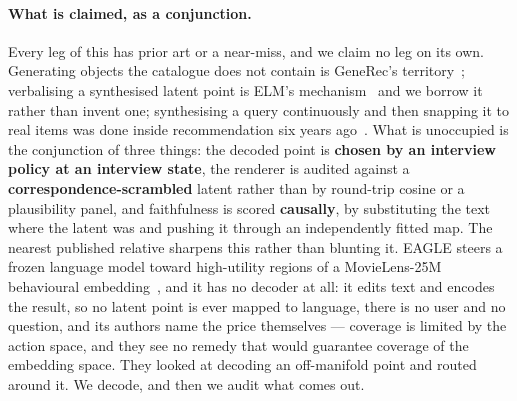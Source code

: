 \documentclass[11pt]{article}
\begin{document}
\paragraph{What is claimed, as a conjunction.} Every leg of this has prior art or a near-miss, and we
claim no leg on its own. Generating objects the catalogue does not contain is GeneRec's
territory~\cite{wang2023generec}; verbalising a synthesised latent point is ELM's
mechanism~\cite{tennenholtz2023elm} and we borrow it rather than invent one; synthesising a query
continuously and then snapping it to real items was done inside recommendation six years
ago~\cite{vendrov2020gradient}. What is unoccupied is the conjunction of three things: the decoded
point is \textbf{chosen by an interview policy at an interview state}, the renderer is audited
against a \textbf{correspondence-scrambled} latent rather than by round-trip cosine or a plausibility
panel, and faithfulness is scored \textbf{causally}, by substituting the text where the latent was
and pushing it through an independently fitted map. The nearest published relative sharpens this
rather than blunting it. EAGLE steers a frozen language model toward high-utility regions of a
MovieLens-25M behavioural embedding~\cite{tennenholtz2024eagle}, and it has no decoder at all: it
edits text and encodes the result, so no latent point is ever mapped to language, there is no user
and no question, and its authors name the price themselves --- coverage is limited by the action
space, and they see no remedy that would guarantee coverage of the embedding space. They looked at
decoding an off-manifold point and routed around it. We decode, and then we audit what comes out.
\end{document}
